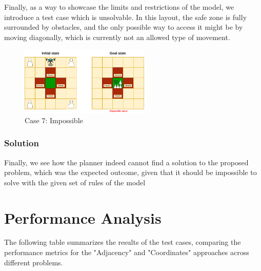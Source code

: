 \documentclass{article}
\begin{document}
Finally, as a way to showcase the limits and restrictions of the model, we introduce a test case which is unsolvable. In this layout, the safe zone is fully surrounded by obstacles, and the only possible way to access it might be by moving diagonally, which is currently not an allowed type of movement.

\begin{figure}[H]
    \centering
    \includegraphics[width=0.55\textwidth]{assets/problem-7-impossible.drawio.png} %
    \caption{Case 7: Impossible}
    \label{fig:initial-state-impossible}
\end{figure}

\subsubsection{Solution}
Finally, we see how the planner indeed cannot find a solution to the proposed problem, which was the expected outcome, given that it should be impossible to solve with the given set of rules of the model

\section{Performance Analysis}

The following table summarizes the results of the test cases, comparing the performance metrics for the "Adjacency" and "Coordinates" approaches across different problems.
\end{document}

